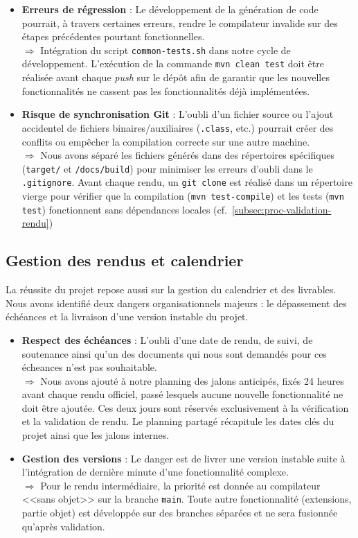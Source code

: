 \begin{itemize}[label=$\circ$]
    \item \textbf{Erreurs de régression} : Le développement de la génération de code pourrait, à travers certaines erreurs, rendre le compilateur invalide sur des étapes précédentes pourtant fonctionnelles.
    \\ $\Rightarrow$ Intégration du script \texttt{common-tests.sh} dans notre cycle de développement. L'exécution de la commande \texttt{mvn clean test} doit être réalisée avant chaque \textit{push} sur le dépôt afin de garantir que les nouvelles fonctionnalités ne cassent pas les fonctionnalités déjà implémentées.

    \item \textbf{Risque de synchronisation Git} : L'oubli d'un fichier source ou l'ajout accidentel de fichiers binaires/auxiliaires (\texttt{.class}, etc.) pourrait créer des conflits ou empêcher la compilation correcte sur une autre machine.
    \\ $\Rightarrow$ Nous avons séparé les fichiers générés dans des répertoires spécifiques (\texttt{target/} et \texttt{/docs/build}) pour minimiser les erreurs d'oubli dans le \texttt{.gitignore}. Avant chaque rendu, un \texttt{git clone} est réalisé dans un répertoire vierge pour vérifier que la compilation (\texttt{mvn test-compile}) et les tests (\texttt{mvn test}) fonctionnent sans dépendances locales (cf.~\ref{subsec:proc-validation-rendu})
\end{itemize}

\subsection{Gestion des rendus et calendrier}
\noindent
La réussite du projet repose aussi sur la gestion du calendrier et des livrables. Nous avons identifié deux dangers organisationnels majeurs : le dépassement des échéances et la livraison d'une version instable du projet.

\begin{itemize}[label=$\circ$]
    \item \textbf{Respect des échéances} : L'oubli d'une date de rendu, de suivi, de soutenance ainsi qu'un des documents qui nous sont demandés pour ces écheances n'est pas souhaitable.
    \\ $\Rightarrow$ Nous avons ajouté à notre planning des jalons anticipés, fixés 24 heures avant chaque rendu officiel, passé lesquels aucune nouvelle fonctionnalité ne doit être ajoutée. Ces deux jours sont réservés exclusivement à la vérification et la validation de rendu. Le planning partagé récapitule les dates clés du projet ainsi que les jalons internes.

    \item \textbf{Gestion des versions} : Le danger est de livrer une version instable suite à l'intégration de dernière minute d'une fonctionnalité complexe.
    \\ $\Rightarrow$ Pour le rendu intermédiaire, la priorité est donnée au compilateur <<sans objet>> sur la branche \texttt{main}. Toute autre fonctionnalité (extensions, partie objet) est développée sur des branches séparées et ne sera fusionnée qu'après validation.
\end{itemize}

